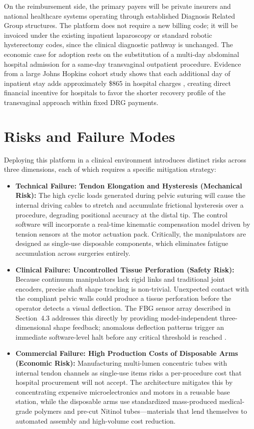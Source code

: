 \documentclass{article}
\begin{document}
On the reimbursement side, the primary payers will be private insurers and national healthcare systems operating through established Diagnosis Related Group structures. The platform does not require a new billing code; it will be invoiced under the existing inpatient laparoscopy or standard robotic hysterectomy codes, since the clinical diagnostic pathway is unchanged. The economic case for adoption rests on the substitution of a multi-day abdominal hospital admission for a same-day transvaginal outpatient procedure. Evidence from a large Johns Hopkins cohort study shows that each additional day of inpatient stay adds approximately \$865 in hospital charges \cite{kohn2023cost}, creating direct financial incentive for hospitals to favor the shorter recovery profile of the transvaginal approach within fixed DRG payments.

\section{Risks and Failure Modes}

Deploying this platform in a clinical environment introduces distinct risks across three dimensions, each of which requires a specific mitigation strategy:

\begin{itemize}
    \item \textbf{Technical Failure: Tendon Elongation and Hysteresis (Mechanical Risk):} The high cyclic loads generated during pelvic suturing will cause the internal driving cables to stretch and accumulate frictional hysteresis over a procedure, degrading positional accuracy at the distal tip. The control software will incorporate a real-time kinematic compensation model driven by tension sensors at the motor actuation pack. Critically, the manipulators are designed as single-use disposable components, which eliminates fatigue accumulation across surgeries entirely.
    \item \textbf{Clinical Failure: Uncontrolled Tissue Perforation (Safety Risk):} Because continuum manipulators lack rigid links and traditional joint encoders, precise shaft shape tracking is non-trivial. Unexpected contact with the compliant pelvic walls could produce a tissue perforation before the operator detects a visual deflection. The FBG sensor array described in Section~4.3 addresses this directly by providing model-independent three-dimensional shape feedback; anomalous deflection patterns trigger an immediate software-level halt before any critical threshold is reached \cite{li2023shapesensing}.
    \item \textbf{Commercial Failure: High Production Costs of Disposable Arms (Economic Risk):} Manufacturing multi-lumen concentric tubes with internal tendon channels as single-use items risks a per-procedure cost that hospital procurement will not accept. The architecture mitigates this by concentrating expensive microelectronics and motors in a reusable base station, while the disposable arms use standardized mass-produced medical-grade polymers and pre-cut Nitinol tubes---materials that lend themselves to automated assembly and high-volume cost reduction.
\end{itemize}
\end{document}
